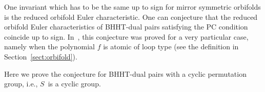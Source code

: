 One invariant which has to be the same up to sign for mirror symmetric orbifolds is the reduced orbifold Euler characteristic. One can conjecture that the reduced orbifold Euler characteristics of BHHT-dual pairs satisfying the PC condition coincide up to sign. In~\cite{EG-1811}, this conjecture was proved for a very particular case, namely when the polynomial $f$ is atomic of loop type (see the definition in Section~\ref{sect:orbifold}).

Here we prove the conjecture for BHHT-dual pairs with a cyclic permutation group, i.e., $S$~is a cyclic group.
